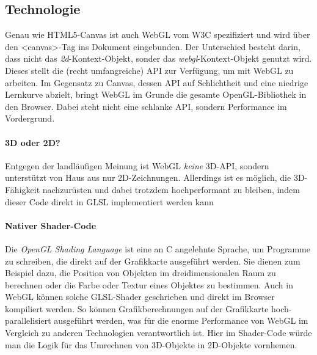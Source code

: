 \documentclass[a4paper, 12pt]{article}
\begin{document}
\subsection{Technologie}
Genau wie HTML5-Canvas ist auch WebGL vom W3C spezifiziert und wird über den <canvas>-Tag ins Dokument eingebunden. Der Unterschied besteht darin, dass nicht das \emph{2d}-Kontext-Objekt, sonder das \emph{webgl}-Kontext-Objekt genutzt wird. Dieses stellt die (recht umfangreiche) API zur Verfügung, um mit WebGL zu arbeiten. Im Gegensatz zu Canvas, dessen API auf Schlichtheit und eine niedrige Lernkurve abzielt, bringt WebGL im Grunde die gesamte OpenGL-Bibliothek in den Browser. Dabei steht nicht eine schlanke API, sondern Performance im Vordergrund.
\paragraph{3D oder 2D?} Entgegen der landläufigen Meinung ist WebGL \emph{keine} 3D-API, sondern unterstützt von Haus aus nur 2D-Zeichnungen. Allerdings ist es möglich, die 3D-Fähigkeit nachzurüsten und dabei trotzdem hochperformant zu bleiben, indem dieser Code direkt in GLSL implementiert werden kann
\paragraph{Nativer Shader-Code} Die \emph{OpenGL Shading Language} ist eine an C angelehnte Sprache, um Programme zu schreiben, die direkt auf der Grafikkarte ausgeführt werden. Sie dienen zum Beispiel dazu, die Position von Objekten im dreidimensionalen Raum zu berechnen oder die Farbe oder Textur eines Objektes zu bestimmen. Auch in WebGL können solche GLSL-Shader geschrieben und direkt im Browser kompiliert werden. So können Grafikberechnungen auf der Grafikkarte hoch-parallelisiert ausgeführt werden, was für die enorme Performance von WebGL im Vergleich zu anderen Technologien verantwortlich ist. Hier im Shader-Code würde man die Logik für das Umrechnen von 3D-Objekte in 2D-Objekte vornhemen.
\end{document}
